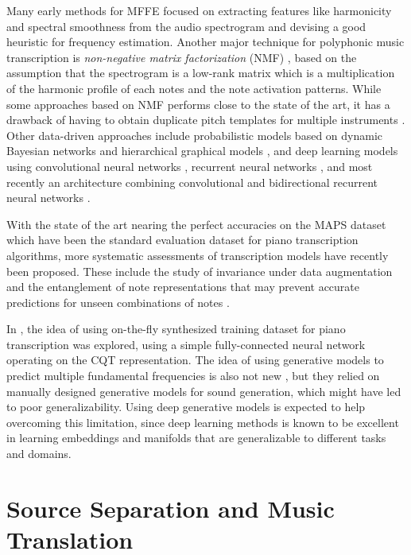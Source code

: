 Many early methods for MFFE \cite{klapuri2003multiple} focused on extracting features like harmonicity and spectral smoothness from the audio spectrogram and devising a good heuristic for frequency estimation.
Another major technique for polyphonic music transcription is \emph{non-negative matrix factorization} (NMF) \cite{lee2001nmf}, based on the assumption that the spectrogram is a low-rank matrix which is a multiplication of the harmonic profile of each notes and the note activation patterns.
While some approaches \cite{gao2017nmf} based on NMF performs close to the state of the art, it has a drawback of having to obtain duplicate pitch templates for multiple instruments \cite{bertin2010nmf}.
Other data-driven approaches include probabilistic models based on dynamic Bayesian networks \cite{raczynski2013dynamic} and hierarchical graphical models \cite{pesek2017hierarchical}, and deep learning models using convolutional neural networks \cite{bittner2017deepsalience}, recurrent neural networks \cite{bock2012rnn,sigtia2016endtoend}, and most recently an architecture combining convolutional and bidirectional recurrent neural networks \cite{hawthorne2018piano}.

With the state of the art nearing the perfect accuracies \cite{ewert2017transcription} on the MAPS dataset \cite{emiya2010multipitch} which have been the standard evaluation dataset for piano transcription algorithms, more systematic assessments of transcription models have recently been proposed.
These include the study of invariance under data augmentation \cite{thickstun2017invariances} and the entanglement of note representations that may prevent accurate predictions for unseen combinations of notes \cite{kelz2017entanglement}.

In \cite{li2017infinite}, the idea of using on-the-fly synthesized training dataset for piano transcription was explored, using a simple fully-connected neural network operating on the CQT representation.
The idea of using generative models to predict multiple fundamental frequencies is also not new \cite{dubois2005harmonic,cemgil2006generative}, but they relied on manually designed generative models for sound generation, which might have led to poor generalizability.
Using deep generative models is expected to help overcoming this limitation, since deep learning methods is known to be excellent in learning embeddings and manifolds that are generalizable to different tasks and domains.


\section{Source Separation and Music Translation}

